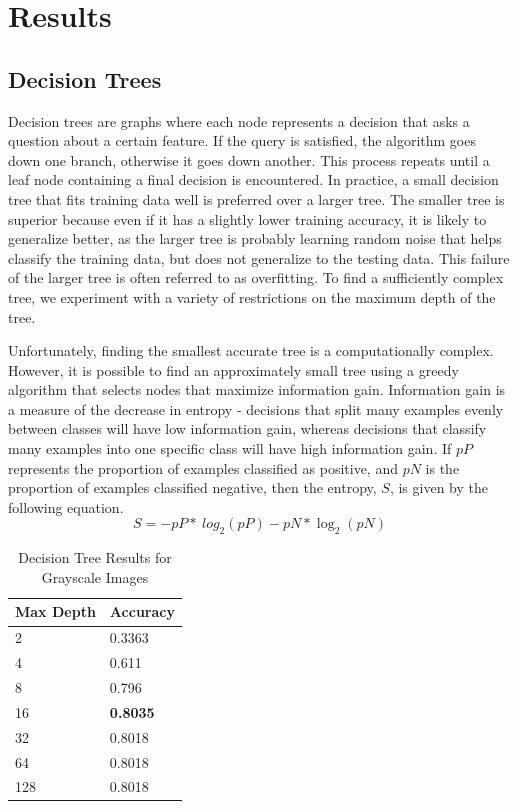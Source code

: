 \documentclass[12pt]{article}
\begin{document}
\section*{Results}
\subsection*{Decision Trees}
Decision trees are graphs where each node represents a decision that asks a question about a certain feature. If the query is satisfied, the algorithm goes down one branch, otherwise it goes down another. This process repeats until a leaf node containing a final decision is encountered. In practice, a small decision tree that fits training data well is preferred over a larger tree. The smaller tree is superior because even if it has a slightly lower training accuracy, it is likely to generalize better, as the larger tree is probably learning random noise that helps classify the training data, but does not generalize to the testing data. This failure of the larger tree is often referred to as overfitting. To find a sufficiently complex tree, we experiment with a variety of restrictions on the maximum depth of the tree.

Unfortunately, finding the smallest accurate tree is a computationally complex. However, it is possible to find an approximately small tree using a greedy algorithm that selects nodes that maximize information gain. Information gain is a measure of the decrease in entropy - decisions that split many examples evenly between classes will have low information gain, whereas decisions that classify many examples into one specific class will have high information gain. If $pP$ represents the proportion of examples classified as positive, and $pN$ is the proportion of examples classified negative, then the entropy, $S$, is given by the following equation.
\[
S = -pP *\ log_2(pP) -pN * \log_2(pN)
\]
\begin{table}[ht!]
\centering
\caption{Decision Tree Results for Grayscale Images}
    \begin{tabular}{|l|l|}
    \hline
    Max Depth & Accuracy \\ \hline
    2      & 0.3363   \\ \hline
    4      & 0.611   \\ \hline
    8      & 0.796   \\ \hline
    16      & \textbf{0.8035}   \\ \hline
    32      & 0.8018   \\ \hline
    64      & 0.8018   \\ \hline
    128      & 0.8018   \\ \hline
    \end{tabular}
\end{table}
\end{document}
